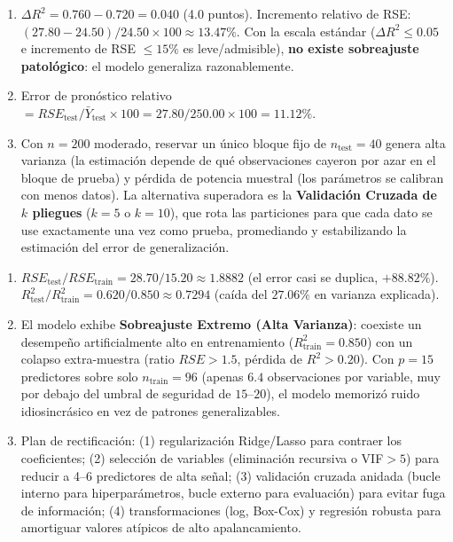 \begin{solproblema}[prob:7d813ee]
	\begin{enumerate}
		\item $\Delta R^2 = 0.760-0.720=0.040$ (4.0 puntos). Incremento relativo de RSE: $(27.80-24.50)/24.50\times100\approx13.47\%$. Con la escala estándar ($\Delta R^2\le0.05$ e incremento de RSE $\le15\%$ es leve/admisible), \textbf{no existe sobreajuste patológico}: el modelo generaliza razonablemente.
		\item Error de pronóstico relativo $=RSE_{\text{test}}/\bar{Y}_{\text{test}}\times100=27.80/250.00\times100=11.12\%$.
		\item Con $n=200$ moderado, reservar un único bloque fijo de $n_{\text{test}}=40$ genera alta varianza (la estimación depende de qué observaciones cayeron por azar en el bloque de prueba) y pérdida de potencia muestral (los parámetros se calibran con menos datos). La alternativa superadora es la \textbf{Validación Cruzada de $k$ pliegues} ($k=5$ o $k=10$), que rota las particiones para que cada dato se use exactamente una vez como prueba, promediando y estabilizando la estimación del error de generalización.
	\end{enumerate}
\end{solproblema}

\begin{solproblema}[prob:d0d57bc]
	\begin{enumerate}
		\item $RSE_{\text{test}}/RSE_{\text{train}} = 28.70/15.20 \approx1.8882$ (el error casi se duplica, $+88.82\%$). $R_{\text{test}}^2/R_{\text{train}}^2 = 0.620/0.850\approx0.7294$ (caída del $27.06\%$ en varianza explicada).
		\item El modelo exhibe \textbf{Sobreajuste Extremo (Alta Varianza)}: coexiste un desempeño artificialmente alto en entrenamiento ($R_{\text{train}}^2=0.850$) con un colapso extra-muestra (ratio $RSE>1.5$, pérdida de $R^2>0.20$). Con $p=15$ predictores sobre solo $n_{\text{train}}=96$ (apenas $6.4$ observaciones por variable, muy por debajo del umbral de seguridad de $15$–$20$), el modelo memorizó ruido idiosincrásico en vez de patrones generalizables.
		\item Plan de rectificación: (1) regularización Ridge/Lasso para contraer los coeficientes; (2) selección de variables (eliminación recursiva o VIF$>5$) para reducir a 4–6 predictores de alta señal; (3) validación cruzada anidada (bucle interno para hiperparámetros, bucle externo para evaluación) para evitar fuga de información; (4) transformaciones (log, Box-Cox) y regresión robusta para amortiguar valores atípicos de alto apalancamiento.
	\end{enumerate}
\end{solproblema}

